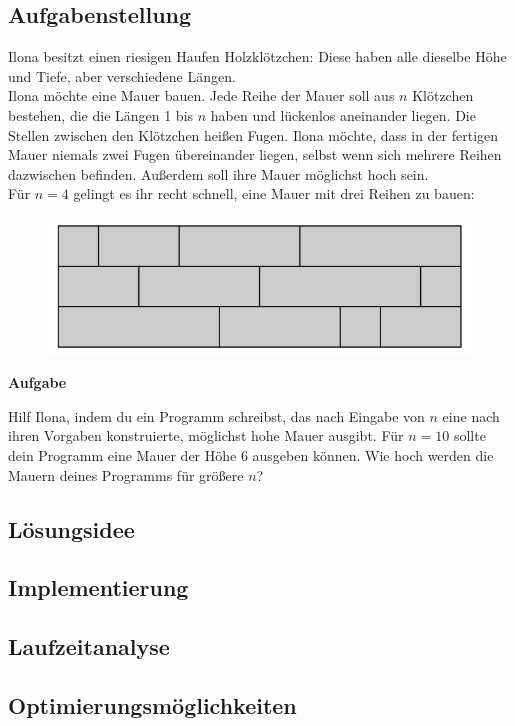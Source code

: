 \documentclass[a4paper,12pt]{article}			%
\begin{document}
\subsection{Aufgabenstellung}
Ilona besitzt einen riesigen Haufen Holzklötzchen: Diese haben alle dieselbe Höhe und Tiefe,
aber verschiedene Längen. \\
Ilona möchte eine Mauer bauen. Jede Reihe der Mauer soll aus $n$ Klötzchen bestehen, die die
Längen 1 bis $n$ haben und lückenlos aneinander liegen. Die Stellen zwischen den Klötzchen heißen
Fugen. Ilona möchte, dass in der fertigen Mauer niemals zwei Fugen übereinander liegen,
selbst wenn sich mehrere Reihen dazwischen befinden. Außerdem soll ihre Mauer möglichst
hoch sein. \\
Für $n = 4$ gelingt es ihr recht schnell, eine Mauer mit drei Reihen zu bauen:
\begin{figure}[H]
    \includegraphics[width=0.7\linewidth]{Bilder/Aufgabe1/Aufgabenstellung_BeispielMauer.png}
\end{figure}
\begin{large}
    \textbf{Aufgabe} \\
\end{large}
Hilf Ilona, indem du ein Programm schreibst, das nach Eingabe von $n$ eine nach ihren Vorgaben
konstruierte, möglichst hohe Mauer ausgibt. Für $n = 10$ sollte dein Programm eine Mauer der
Höhe 6 ausgeben können. Wie hoch werden die Mauern deines Programms für größere $n$?

\subsection{Lösungsidee}

\subsection{Implementierung}

\subsection{Laufzeitanalyse}

\subsection{Optimierungsmöglichkeiten}
\end{document}
